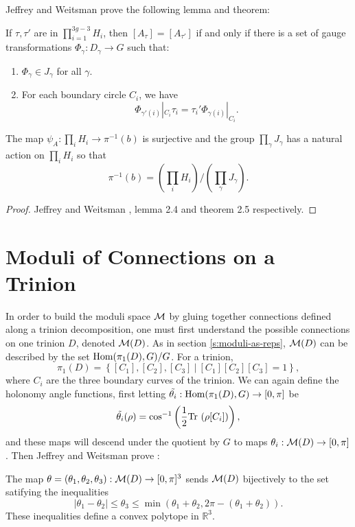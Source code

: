 	Jeffrey and Weitsman prove the following lemma and theorem:
	\begin{lemma}
		If $\tau,\tau'$ are in $\prod_{i=1}^{3g-3} H_i$, then $[A_\tau] = [A_{\tau'}]$ if and only if there is a set of gauge transformations $\Phi_\gamma:D_\gamma \to G$ such that:
		\begin{enumerate}
			\item $\Phi_\gamma \in J_\gamma$ for all $\gamma$.
			\item For each boundary circle $C_i$, we have
			$$
				\Phi_{\gamma'(i)}|_{C_i} \tau_i = \tau_i' \Phi_{\gamma(i)}|_{C_i}.
			$$
		\end{enumerate}
	\end{lemma} 
	\begin{theorem}
		The map $\psi_A:\prod_i H_i \to \pi^{-1}(b)$ is surjective and the group $\prod_\gamma J_\gamma$ has a natural action on $\prod_i H_i$ so that
		\begin{equation}
			\pi^{-1}(b) = \left(\prod_i H_i\right)/\left(\prod_\gamma J_\gamma\right).
		\end{equation}
	\end{theorem}
	\begin{proof}
		Jeffrey and Weitsman \cite{jeffrey_bohr-sommerfeld_1992}, lemma 2.4 and theorem 2.5 respectively.
	\end{proof}

\section{Moduli of Connections on a Trinion}
	In order to build the moduli space $\mathcal{M}$ by gluing together connections defined along a trinion decomposition, one must first understand the possible connections on one trinion $D$, denoted $\mathcal{M}(D)$. As in section \ref{s:moduli-as-reps}, $\mathcal{M}(D)$ can be described by the set $\text{Hom}(\pi_1(D),G)/G$. For a trinion, 
	\begin{equation}
		\pi_1(D) = \left\{
		[C_1], [C_2], [C_3] ~|~ [C_1][C_2][C_3]  =1
		\right\},
	\end{equation}
	where $C_i$ are the three boundary curves of the trinion. We can again define the holonomy angle functions, first letting $\tilde{\theta_i}:\text{Hom}(\pi_1(D),G) \to [0,\pi]$ be
	\begin{equation}
		\label{e:thetacoords}
		\tilde{\theta_i}(\rho) = \cos^{-1}\left(\frac{1}{2}\text{Tr }(\rho[C_i])\right),
	\end{equation}
	and these maps will descend under the quotient by $G$ to maps $\theta_i:\mathcal{M}(D)\to [0,\pi]$. Then Jeffrey and Weitsman prove \cite[Proposition 3.1]{jeffrey_bohr-sommerfeld_1992}:
	\begin{theorem}[]
		The map $\theta = (\theta_1, \theta_2, \theta_3):\mathcal{M}(D)\to[0,\pi]^3$ sends $\mathcal{M}(D)$ bijectively to the set satifying the inequalities
		\begin{equation}
			|\theta_1 - \theta_2| \leq \theta_3 \leq \min(\theta_1 + \theta_2, 2\pi - (\theta_1 + \theta_2)).
			\label{e:trinion-ineqs}
		\end{equation}
		These inequalities define a convex polytope in $\mathbb{R}^3$.
	\end{theorem}

